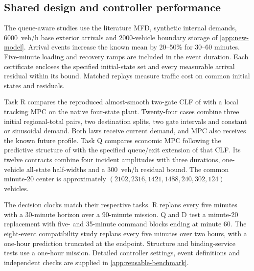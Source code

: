 \documentclass[preprint,12pt]{elsarticle}
\newcommand{\appref}[1]{\ref{#1}}
\begin{document}
\subsection{Shared design and controller performance}
\label{sec:new-incident-protocol}
\label{sec:controller-benchmarks}

The queue-aware studies use the literature MFD, synthetic internal demands,
6000~veh/h base exterior arrivals and 2000-vehicle boundary storage of
\appref{app:new-model}. Arrival events increase the known mean by 20--50\%
for 30--60 minutes. Five-minute loading and recovery ramps are included in
the event duration. Each certificate encloses the specified initial-state
set and every measurable arrival residual within its bound. Matched replays
measure traffic cost on common initial states and residuals.

Task R compares the reproduced almost-smooth two-gate CLF of
\cite{zhong2018robust} with a local tracking MPC on the native four-state
plant. Twenty-four cases combine three initial regional-total pairs, two
destination splits, two gate intervals and constant or sinusoidal demand.
Both laws receive current demand, and MPC also receives the known future profile.
Task Q compares economic MPC following the predictive structure of
\cite{geroliminis2013mpc} with the specified queue/exit extension of that CLF.
Its twelve contracts combine four incident amplitudes with three durations,
one-vehicle all-state half-widths and a 300~veh/h residual bound.
The common minute-20 center is approximately
$(2102,2316,1421,1488,240,302,124)$ vehicles.

The decision clocks match their respective tasks. R replans every five
minutes with a 30-minute horizon over a 90-minute mission. Q and D test a
minute-20 replacement with five- and 35-minute command blocks ending at
minute 60. The eight-event compatibility study replans every five minutes
over two hours, with a one-hour prediction truncated at the endpoint.
Structure and binding-service tests use a one-hour mission. Detailed
controller settings, event definitions and independent checks are supplied
in \appref{app:reusable-benchmark}.
\end{document}
